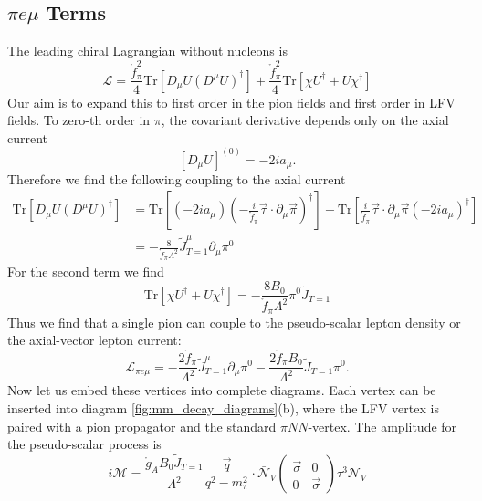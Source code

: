 \documentclass{book}[12pt]
\begin{document}
\subsection{$\pi e\mu$ Terms}
The leading chiral Lagrangian without nucleons is
\begin{equation}
\mathcal{L}=\frac{\mathring{f}_{\pi}^2}{4}\mathrm{Tr}\left[D_{\mu}U\left(D^{\mu}U\right)^{\dag}\right]+\frac{\mathring{f}_{\pi}^2}{4}\mathrm{Tr}\left[\chi U^{\dag}+U\chi^{\dag}\right]
\end{equation}
Our aim is to expand this to first order in the pion fields and first order in LFV fields. To zero-th order in $\pi$, the covariant derivative depends only on the axial current
\begin{equation}
\left[D_{\mu}U\right]^{(0)}=-2ia_{\mu}.
\end{equation}
Therefore we find the following coupling to the axial current
\begin{equation}
\begin{split}
\mathrm{Tr}\left[D_{\mu}U\left(D^{\mu}U\right)^{\dag}\right]&=\mathrm{Tr}\left[(-2ia_{\mu})\left(-\frac{i}{\mathring{f}_{\pi}}\vec{\tau}\cdot\partial_{\mu}\vec{\pi}\right)^{\dag}\right]+\mathrm{Tr}\left[\frac{i}{\mathring{f}_{\pi}}\vec{\tau}\cdot\partial_{\mu}\vec{\pi}(-2ia_{\mu})^{\dag}\right]\\
&=-\frac{8}{\mathring{f}_{\pi}\Lambda^2}\tilde{J}^{\mu}_{T=1}\partial_{\mu}\pi^0
\end{split}
\end{equation}
For the second term we find
\begin{equation}
\mathrm{Tr}\left[\chi U^{\dag}+U\chi^{\dag}\right]=-\frac{8B_0}{\mathring{f}_{\pi}\Lambda^2}\pi^0\tilde{J}_{T=1}
\end{equation}
Thus we find that a single pion can couple to the pseudo-scalar lepton density or the axial-vector lepton current:
\begin{equation}
\mathcal{L}_{\pi e\mu}=-\frac{2\mathring{f}_{\pi}}{\Lambda^2}\tilde{J}^{\mu}_{T=1}\partial_{\mu}\pi^0-\frac{2\mathring{f}_{\pi}B_0}{\Lambda^2}\tilde{J}_{T=1}\pi^0.
\end{equation}
Now let us embed these vertices into complete diagrams. Each vertex can be inserted into diagram \ref{fig:mm_decay_diagrams}(b), where the LFV vertex is paired with a pion propagator and the standard $\pi NN$-vertex.
The amplitude for the pseudo-scalar process is
\begin{equation}
i\mathcal{M}=\frac{\mathring{g}_AB_0\tilde{J}_{T=1}}{\Lambda^2}\frac{\vec{q}}{q^2-m_{\pi}^2}\cdot\bar{\mathcal{N}}_V\left(\begin{array}{cc}
\vec{\sigma} & 0 \\
0 & \vec{\sigma}
\end{array}\right)\tau^3 \mathcal{N}_V
\end{equation}
\end{document}

